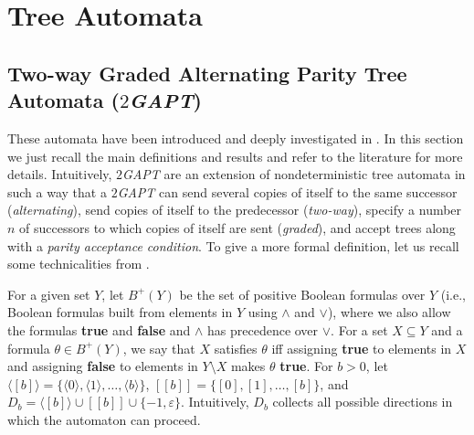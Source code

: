 \documentclass{LMCS}
\theoremstyle{plain}
\def \TGAPT         {\emph{$2$GAPT}\xspace}
\newcommand \tpl[1] {\langle #1 \rangle}
\begin{document}
\section{Tree Automata}\label{sec:TreeAutomata}
\subsection{Two-way Graded Alternating Parity Tree Automata (\TGAPT)}\label{sub:Tgapt}
These automata have been introduced and deeply investigated in \cite{BLMV06}.
In this section we just recall the main definitions and results and refer to
the literature for more details. Intuitively, \TGAPT are an extension of
nondeterministic tree automata in such a way that a \TGAPT can send several
copies of itself to the same successor (\emph{alternating}), send copies of
itself to the predecessor (\emph{two-way}), specify a number $n$ of successors
to which copies of itself are sent (\emph{graded}), and accept trees along with
a \emph{parity acceptance condition}. To give a more formal definition, let us
recall some technicalities from \cite{BLMV06}.

For a given set $Y$, let $B^{+}(Y)$ be the set of positive Boolean formulas
over $Y$ (i.e., Boolean formulas built from elements in $Y$ using $\wedge$ and
$\vee$), where we also allow the formulas \textbf{true} and \textbf{false} and
$\wedge$ has precedence over $\vee$. For a set $X \subseteq Y$ and a formula
$\theta \in B^{+}(Y)$, we say that $X$ satisfies $\theta$ iff assigning
\textbf{true} to elements in $X$ and assigning \textbf{false} to elements in $Y
\setminus X$ makes $\theta$ \textbf{true}.  For $b>0$, let $\tpl{[b]} = \{
\tpl{0}, \tpl{1}, \ldots, \tpl{b}\}$, $[[b]]= \{[0],[1],\ldots,[b]\}$, and $D_b
= \tpl{[b]} \cup [[b]] \cup \{-1, \varepsilon \}$. Intuitively, $D_b$ collects
all possible directions in which the automaton can proceed.
\end{document}
